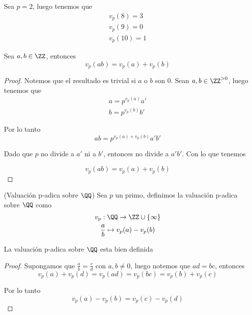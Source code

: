 \documentclass[a4paper,oneside,10.5pt]{USMArt}
\begin{document}
\begin{ejemplo}
  Sea $p = 2$, luego tenemos que
  \begin{gather*}
    v_{p}(8) = 3\\
    v_{p}(9) = 0\\
    v_{p}(10) = 1
  \end{gather*}
\end{ejemplo}

\begin{prop}
  Sea $a, b \in \ZZ$, entonces
  \begin{equation*}
    v_{p}(ab) = v_{p}(a) + v_{p}(b)
  \end{equation*}
\end{prop}

\begin{proof}
  Notemos que el resultado es trivial si $a$ o $b$ son $0$. Sean $a, b \in \ZZ^{>0}$, luego tenemos que
  \begin{gather*}
    a = p^{v_{p}(a)}a'\\
    b = p^{v_{p}(b)}b'
  \end{gather*}

  Por lo tanto
  \begin{equation*}
    ab = p^{v_{p}(a) + v_{p}(b)}a'b'
  \end{equation*}

  Dado que $p$ no divide a $a'$ ni a $b'$, entonces no divide a $a'b'$.
  Con lo que tenemos

  \begin{equation*}
    v_{p}(ab) = v_{p}(a) + v_{p}(b)
  \end{equation*}
\end{proof}

\begin{defi}{(Valuaci\'on p-adica sobre $\QQ$)}
  Sea $p$ un primo, definimos la valuaci\'on p-adica sobre $\QQ$ como
  \begin{gather*}
    v_{p} : \QQ \to \ZZ \cup \{\infty\}\\
    \frac{a}{b} \mapsto v_{p}(a) - v_{p}(b)
  \end{gather*}
\end{defi}

\begin{prop}
  La valuaci\'on p-adica sobre $\QQ$ esta bien definida
\end{prop}
\begin{proof}
  Supongamos que $\frac{a}{b} = \frac{c}{d}$ con $a, b \neq 0$, luego notemos que $ad = bc$, entonces
  \begin{equation*}
    v_{p}(a) + v_{p}(d) = v_{p}(ad) = v_{p}(bc) = v_{p}(b) + v_{p}(c)
  \end{equation*}

  Por lo tanto
  \begin{equation*}
    v_{p}(a) - v_{p}(b) = v_{p}(c) - v_{p}(d)
  \end{equation*}
\end{proof}
\end{document}
